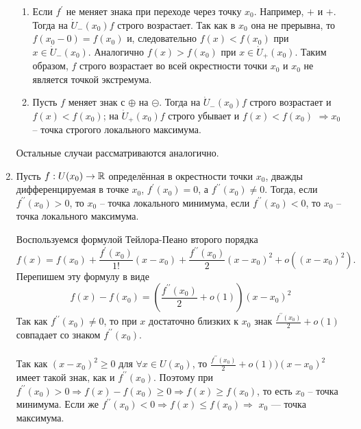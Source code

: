 \begin{enumerate}
\begin{theorem}
	\end{theorem}
	\begin{Proof}
		\begin{enumerate}
			\item Если $f^\prime$ не меняет знака при переходе через точку $x_0$. Например, $+$ и $+$. Тогда на $\dot U_-(x_0) f$ строго возрастает. Так как в $x_0$ она не прерывна, то $f(x_0 - 0) = f(x_0)$ и, следовательно $f(x) < f(x_0)$ при $x \in \dot U_-(x_0)$. Аналогично $f(x) > f(x_0)$ при $x \in \dot U_+(x_0)$. Таким образом, $f$ строго возрастает во всей окрестности  точки $x_0$ и $x_0$ не является точкой экстремума.
			\item Пусть $f$ меняет знак с $\oplus$ на $\circleddash$. Тогда на $\dot U_-(x_0) f$ строго возрастает и $f(x) < f(x_0)$; на $\dot U_+(x_0) f$ строго убывает и $f(x) < f(x_0)$ $\Rightarrow x_0$ -- точка строгого локального максимума.
		\end{enumerate}
		Остальные случаи рассматриваются аналогично.
	\end{Proof} 
	\item \begin{theorem}
		Пусть $f: U(x_0) \rightarrow \mathbb{R}$ определённая в окрестности точки $x_0$, дважды дифференцируемая в точке $x_0$, $f^\prime(x_0) = 0$, а $f^{\prime\prime}(x_0) \neq 0$. Тогда, если $f^{\prime\prime}(x_0) > 0$, то $x_0$ -- точка локального минимума, если $f^{\prime\prime}(x_0) < 0$, то $x_0$ -- точка локального максимума.
	\end{theorem}
	\begin{Proof}
		Воспользуемся формулой Тейлора-Пеано второго порядка $$f(x) = f(x_0) + \frac{f^\prime(x_0)}{1!} (x - x_0) + \frac{f^{\prime\prime}(x_0)}{2} {(x - x_0)}^2 + o({(x - x_0)}^2).$$
		Перепишем эту формулу в виде
		$$f(x) - f(x_0)  = (\frac{f^{\prime\prime}(x_0)}{2} + o(1)) {(x - x_0)}^2$$
		Так как $f^{\prime\prime}(x_0) \neq 0$, то при $x$ достаточно близких к $x_0$ знак $\frac{f^{\prime\prime}(x_0)}{2} + o(1)$ совпадает со знаком $f^{\prime\prime}(x_0)$.\\\\
		Так как ${(x - x_0)}^2 \ge 0$ для $\forall x \in U(x_0)$, то $\frac{f^{\prime\prime}(x_0)}{2} + o(1)) {(x - x_0)}^2$ имеет такой знак, как и $f^{\prime\prime}(x_0)$. Поэтому  при $f^{\prime\prime}(x_0) > 0 \Rightarrow f(x) - f(x_0) \ge 0 \Rightarrow f(x) \ge f(x_0)$, то есть $x_0$ -- точка минимума. Если же $f^{\prime\prime}(x_0) < 0 \Rightarrow f(x) \le f(x_0) \Rightarrow$ $x_0$ --- точка максимума.  
	\end{Proof} \\\\

\end{enumerate}
